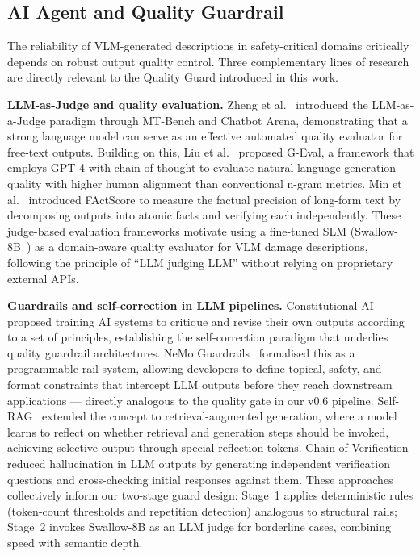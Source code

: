\documentclass[twocolumn]{article}
\begin{document}
\subsection{AI Agent and Quality Guardrail}
\label{sec:related:guard}

The reliability of VLM-generated descriptions in safety-critical domains
critically depends on robust output quality control.
Three complementary lines of research are directly relevant to the
Quality Guard introduced in this work.

\textbf{LLM-as-Judge and quality evaluation.}
Zheng et al.~\cite{zheng2023judge} introduced the LLM-as-a-Judge paradigm
through MT-Bench and Chatbot Arena, demonstrating that a strong language
model can serve as an effective automated quality evaluator for free-text
outputs.
Building on this, Liu et al.~\cite{liu2023geval} proposed G-Eval, a
framework that employs GPT-4 with chain-of-thought to evaluate natural
language generation quality with higher human alignment than conventional
n-gram metrics.
Min et al.~\cite{min2023factscore} introduced FActScore to measure the
factual precision of long-form text by decomposing outputs into atomic
facts and verifying each independently.
These judge-based evaluation frameworks motivate using a fine-tuned SLM
(Swallow-8B~\cite{tokyotech2024swallow}) as a domain-aware quality
evaluator for VLM damage descriptions, following the principle of
``LLM judging LLM'' without relying on proprietary external APIs.

\textbf{Guardrails and self-correction in LLM pipelines.}
Constitutional AI~\cite{bai2022constitutional} proposed training AI
systems to critique and revise their own outputs according to a set of
principles, establishing the self-correction paradigm that underlies
quality guardrail architectures.
NeMo Guardrails~\cite{rebedea2023nemo} formalised this as a programmable
rail system, allowing developers to define topical, safety, and format
constraints that intercept LLM outputs before they reach downstream
applications --- directly analogous to the quality gate in our v0.6 pipeline.
Self-RAG~\cite{asai2023selfrag} extended the concept to retrieval-augmented
generation, where a model learns to reflect on whether retrieval and
generation steps should be invoked, achieving selective output through
special reflection tokens.
Chain-of-Verification~\cite{dhuliawala2023chainveri} reduced hallucination
in LLM outputs by generating independent verification questions and
cross-checking initial responses against them.
These approaches collectively inform our two-stage guard design:
Stage~1 applies deterministic rules (token-count thresholds and
repetition detection) analogous to structural rails;
Stage~2 invokes Swallow-8B as an LLM judge for borderline cases,
combining speed with semantic depth.
\end{document}
